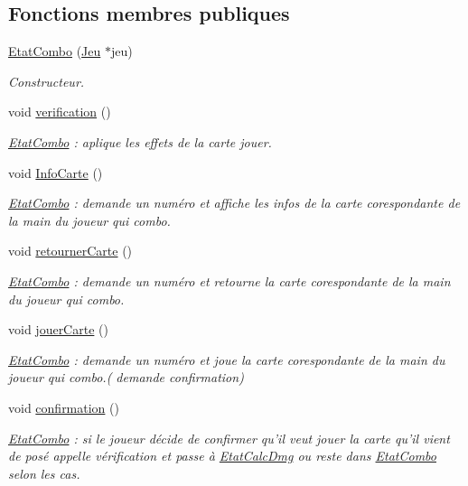\subsection*{Fonctions membres publiques}
\begin{DoxyCompactItemize}
\item 
\hyperlink{class_etat_combo_a182fe8d470e0851c869e4407c04f0e01}{Etat\-Combo} (\hyperlink{class_jeu}{Jeu} $\ast$jeu)
\begin{DoxyCompactList}\small\item\em Constructeur. \end{DoxyCompactList}\item 
void \hyperlink{class_etat_combo_a0a299d7c93ef09787eb0a402708475f0}{verification} ()
\begin{DoxyCompactList}\small\item\em \hyperlink{class_etat_combo}{Etat\-Combo} \-: aplique les effets de la carte jouer. \end{DoxyCompactList}\item 
void \hyperlink{class_etat_combo_a56b4cbe699ca50fc0e6ad4695a744bdf}{Info\-Carte} ()
\begin{DoxyCompactList}\small\item\em \hyperlink{class_etat_combo}{Etat\-Combo} \-: demande un numéro et affiche les infos de la carte corespondante de la main du joueur qui combo. \end{DoxyCompactList}\item 
void \hyperlink{class_etat_combo_a79944dfd6e471b633ad99cd2f3b70b02}{retourner\-Carte} ()
\begin{DoxyCompactList}\small\item\em \hyperlink{class_etat_combo}{Etat\-Combo} \-: demande un numéro et retourne la carte corespondante de la main du joueur qui combo. \end{DoxyCompactList}\item 
void \hyperlink{class_etat_combo_a6d7b6c040664a4c41380aca95f05f42c}{jouer\-Carte} ()
\begin{DoxyCompactList}\small\item\em \hyperlink{class_etat_combo}{Etat\-Combo} \-: demande un numéro et joue la carte corespondante de la main du joueur qui combo.( demande confirmation) \end{DoxyCompactList}\item 
void \hyperlink{class_etat_combo_a26ed3a79035572c4471aab88377470c5}{confirmation} ()
\begin{DoxyCompactList}\small\item\em \hyperlink{class_etat_combo}{Etat\-Combo} \-: si le joueur décide de confirmer qu'il veut jouer la carte qu'il vient de posé appelle vérification et passe à \hyperlink{class_etat_calc_dmg}{Etat\-Calc\-Dmg} ou reste dans \hyperlink{class_etat_combo}{Etat\-Combo} selon les cas. \end{DoxyCompactList}\item 

\end{DoxyCompactItemize}
